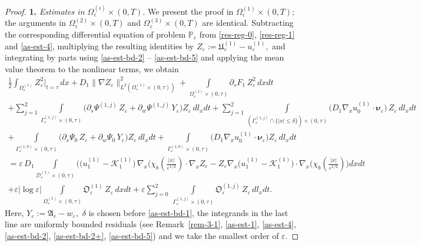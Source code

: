 \documentclass[reqno]{amsart}            %
\numberwithin{equation}{section}
\begin{document}
	\begin{proof} 	\textbf{1.} \emph{Estimates in $\Omega_\varepsilon^{(i)}\times (0,T)$.}
		We present the proof in $\Omega_\varepsilon^{(1)}\times (0,T)$; the arguments in 
		$\Omega_\varepsilon^{(2)}\times (0,T)$ and $\Omega_\varepsilon^{(3)}\times (0,T)$
		are identical.  Subtracting  the corresponding differential equation of problem $\mathbb{P}_\varepsilon$ from \eqref{res-reg-0}, \eqref{res-reg-1} and \eqref{as-est-4},  multiplying the resulting identities by $Z_\varepsilon := \mathfrak{U}^{(1)}_\varepsilon - u^{(1)}_\varepsilon,$ and integrating by parts using \eqref{as-est-bd-2} -- \eqref{as-est-bd-5} and applying  the mean value theorem to the nonlinear terms, we obtain 
		\begin{multline}\label{th-1}
			\frac{1}{2} \int_{\Omega_\varepsilon^{(1)}}Z_\varepsilon^2\big|_{t=\tau}\, dx + D_1 \|\nabla Z_\varepsilon\|^2_{L^2(\Omega_\varepsilon^{(1)}\times(0,\tau))} + \int\limits_{\Omega_\varepsilon^{(1)}\times(0,\tau)} \partial_s F_1 \, Z_\varepsilon^2 \, dxdt
			\\
			+ \sum_{j=1}^{2} \int\limits_{\Gamma_\varepsilon^{(1,j)}\times(0,\tau)}\Big(\partial_s \Psi^{(1,j)} \, Z_\varepsilon +  \partial_w \Psi^{(1,j)} \, Y_\varepsilon\Big) Z_\varepsilon \, dl_xdt +  \sum_{j=1}^{2} \int\limits_{(\Gamma_\varepsilon^{(1,j)} \cap \{|x| \le \delta\})\times(0,\tau)}\big(D_1\nabla_x u_0^{(1)}\cdot\boldsymbol{\nu}_\varepsilon \big) \, 
			Z_\varepsilon \, dl_xdt 
			\\
			+ \int\limits_{\Gamma_\varepsilon^{(1,0)}\times(0,\tau)}\Big(\partial_s \Psi_0 \, Z_\varepsilon +  \partial_w \Psi_0 \, Y_\varepsilon\Big) Z_\varepsilon \, dl_xdt +  \int\limits_{\Gamma_\varepsilon^{(1,0)} \times(0,\tau)}\Big(D_1\nabla_x u_0^{(1)}\cdot\boldsymbol{\nu}_\varepsilon \Big) Z_\varepsilon \, dl_xdt 
			\\
			= \varepsilon\,  D_1 \int\limits_{\mathcal{D}^{(1)}_\varepsilon \times (0,\tau)}\Big(\big(u_1^{(1)} - \mathcal{K}_1^{(1)}\big) \, \nabla_x\big(\chi_b(\tfrac{|x|}{\varepsilon^{1/2}})\cdot \nabla_x Z_\varepsilon - Z_\varepsilon \nabla_x\big(u_1^{(1)} - \mathcal{K}_1^{(1)}\big)\cdot\nabla_x\big(\chi_b(\tfrac{|x|}{\varepsilon^{1/2}})\Big)dxdt
			\\
			+ \varepsilon |\log\varepsilon| \int\limits_{\Omega_\varepsilon^{(1)}\times(0,\tau)}\mathfrak{O}_\varepsilon^{(1)} \, Z_\varepsilon \, dxdt + \varepsilon \sum_{j=0}^{2} \, \int\limits_{\Gamma_\varepsilon^{(1,j)}\times(0,\tau)}\mathfrak{O}_\varepsilon^{(1,j)} \, Z_\varepsilon \, dl_xdt.
		\end{multline} 
		Here, $Y_\varepsilon := \mathfrak{A}_\varepsilon - w_\varepsilon,$	$\delta$ is chosen before \eqref{as-est-bd-1}, the integrands in the last line are uniformly bounded residuals (see Remark~\ref{rem-3-1}, 
		\eqref{as-est-1}, \eqref{as-est-4}, \eqref{as-est-bd-2}, \eqref{as-est-bd-2+}, \eqref{as-est-bd-5}) and we take the smallest order of $\varepsilon.$  
		

\end{proof}
\end{document}
